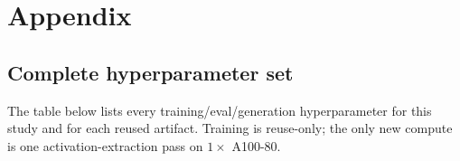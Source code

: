 \documentclass[11pt]{article}
\begin{document}



\appendix
\section{Appendix}
\label{sec:appendix}

\subsection{Complete hyperparameter set}
\label{app:hparams}

The table below lists every training/eval/generation hyperparameter for this study
and for each reused artifact. Training is reuse-only; the only new compute is one
activation-extraction pass on $1\times$ A100-80.
\end{document}
